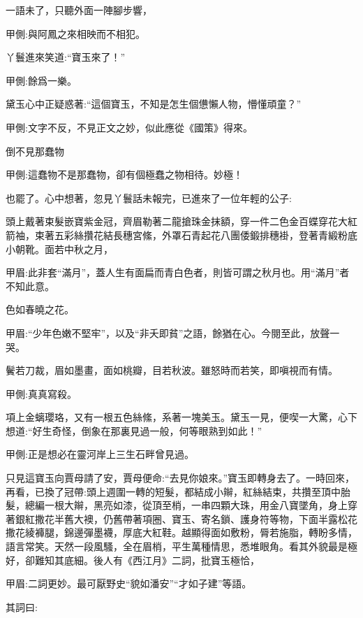 \begin{parag}
    一語未了，只聽外面一陣腳步響，\begin{note}甲側:與阿鳳之來相映而不相犯。\end{note}丫鬟進來笑道:“寶玉來了！”\begin{note}甲側:餘爲一樂。\end{note}黛玉心中正疑惑著:“這個寶玉，不知是怎生個憊懶人物，懵懂頑童？”\begin{note}甲側:文字不反，不見正文之妙，似此應從《國策》得來。\end{note}倒不見那蠢物\begin{note}甲側:這蠢物不是那蠢物，卻有個極蠢之物相待。妙極！\end{note}也罷了。心中想著，忽見丫鬟話未報完，已進來了一位年輕的公子:
\end{parag}


\begin{qute2sp}
    頭上戴著束髮嵌寶紫金冠，齊眉勒著二龍搶珠金抹額，穿一件二色金百蝶穿花大紅箭袖，束著五彩絲攢花結長穗宮絛，外罩石青起花八團倭鍛排穗褂，登著青緞粉底小朝靴。面若中秋之月，\begin{note}甲眉:此非套“滿月”，蓋人生有面扁而青白色者，則皆可謂之秋月也。用“滿月”者不知此意。\end{note}色如春曉之花。\begin{note}甲眉:“少年色嫩不堅牢”，以及“非夭即貧”之語，餘猶在心。今閱至此，放聲一哭。\end{note}鬢若刀裁，眉如墨畫，面如桃瓣，目若秋波。雖怒時而若笑，即嗔視而有情。
\end{qute2sp}


\begin{parag}
    \begin{note}甲側:真真寫殺。\end{note}項上金螭瓔珞，又有一根五色絲絛，系著一塊美玉。黛玉一見，便喫一大驚，心下想道:“好生奇怪，倒象在那裏見過一般，何等眼熟到如此！”\begin{note}甲側:正是想必在靈河岸上三生石畔曾見過。\end{note}只見這寶玉向賈母請了安，賈母便命:“去見你娘來。”寶玉即轉身去了。一時回來，再看，已換了冠帶:頭上週圍一轉的短髮，都結成小辮，紅絲結束，共攢至頂中胎髮，總編一根大辮，黑亮如漆，從頂至梢，一串四顆大珠，用金八寶墜角，身上穿著銀紅撒花半舊大襖，仍舊帶著項圈、寶玉、寄名鎖、護身符等物，下面半露松花撒花綾褲腿，錦邊彈墨襪，厚底大紅鞋。越顯得面如敷粉，脣若施脂，轉盼多情，語言常笑。天然一段風騷，全在眉梢，平生萬種情思，悉堆眼角。看其外貌最是極好，卻難知其底細。後人有《西江月》二詞，批寶玉極恰，\begin{note}甲眉:二詞更妙。最可厭野史“貌如潘安”“才如子建”等語。\end{note}其詞曰:
\end{parag}


